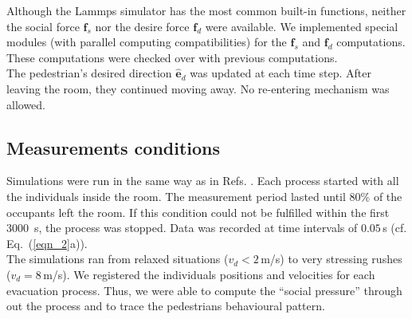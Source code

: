 Although the {\sc Lammps} simulator has the most common built-in functions, 
neither the social force $\mathbf{f}_s$  nor the desire force $\mathbf{f}_d$ 
were available. We implemented special modules (with parallel computing 
compatibilities) for the $\mathbf{f}_s$ and $\mathbf{f}_d$ computations. 
These computations were checked over with previous computations. \\

The pedestrian's desired direction $\hat{\mathbf{e}}_d$ was updated at each 
time step. After leaving the room, they continued moving away. No re-entering 
mechanism was allowed. \\


\subsection{\label{numerical_data}Measurements conditions}

Simulations were run in the same way as in Refs. \cite{Dorso3,Dorso4}.  Each 
process started with all the individuals inside the room. The measurement period 
lasted until 80\% of the occupants left the room. If this condition could not be 
fulfilled within the first 3000~s, the process was stopped. Data was 
recorded at time intervals of $0.05\,$s (cf. Eq.~(\ref{eqn_2}a)).\\

The simulations ran from relaxed situations ($v_d<2\,$m/s) to very stressing 
rushes ($v_d=8\,$m/s). We registered the individuals positions and 
velocities for each evacuation process. Thus, we were able to compute the 
``social pressure'' through out the process and to trace the pedestrians 
behavioural pattern.  \\





